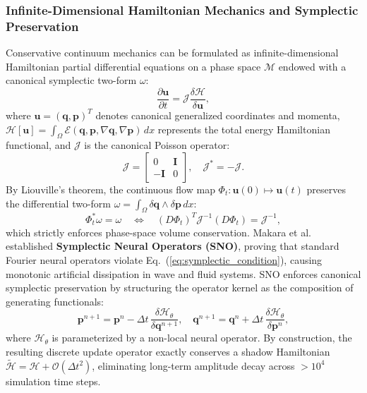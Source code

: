 \subsubsection{Infinite-Dimensional Hamiltonian Mechanics and Symplectic Preservation}
Conservative continuum mechanics can be formulated as infinite-dimensional Hamiltonian partial differential equations on a phase space $\mathcal{M}$ endowed with a canonical symplectic two-form $\omega$:
\begin{equation}
    \frac{\partial \mathbf{u}}{\partial t} = \mathcal{J} \frac{\delta \mathcal{H}}{\delta \mathbf{u}},
    \label{eq:hamiltonian_pde}
\end{equation}
where $\mathbf{u} = (\mathbf{q}, \mathbf{p})^T$ denotes canonical generalized coordinates and momenta, $\mathcal{H}[\mathbf{u}] = \int_\Omega \mathcal{E}(\mathbf{q}, \mathbf{p}, \nabla \mathbf{q}, \nabla \mathbf{p}) \, dx$ represents the total energy Hamiltonian functional, and $\mathcal{J}$ is the canonical Poisson operator:
\begin{equation}
    \mathcal{J} = \begin{bmatrix} 0 & \mathbf{I} \\ -\mathbf{I} & 0 \end{bmatrix}, \quad \mathcal{J}^* = -\mathcal{J}.
\end{equation}
By Liouville's theorem, the continuous flow map $\Phi_t: \mathbf{u}(0) \mapsto \mathbf{u}(t)$ preserves the differential two-form $\omega = \int_\Omega \delta \mathbf{q} \wedge \delta \mathbf{p} \, dx$:
\begin{equation}
    \Phi_t^* \omega = \omega \quad \Longleftrightarrow \quad (D\Phi_t)^T \mathcal{J}^{-1} (D\Phi_t) = \mathcal{J}^{-1},
    \label{eq:symplectic_condition}
\end{equation}
which strictly enforces phase-space volume conservation. Makara et al.~\cite{makara2026symplectic} established \textbf{Symplectic Neural Operators (SNO)}, proving that standard Fourier neural operators violate Eq.~(\ref{eq:symplectic_condition}), causing monotonic artificial dissipation in wave and fluid systems. SNO enforces canonical symplectic preservation by structuring the operator kernel as the composition of generating functionals:
\begin{equation}
    \mathbf{p}^{n+1} = \mathbf{p}^n - \Delta t \, \frac{\delta \mathcal{H}_\theta}{\delta \mathbf{q}^{n+1}}, \quad \mathbf{q}^{n+1} = \mathbf{q}^n + \Delta t \, \frac{\delta \mathcal{H}_\theta}{\delta \mathbf{p}^n},
    \label{eq:sno_update}
\end{equation}
where $\mathcal{H}_\theta$ is parameterized by a non-local neural operator. By construction, the resulting discrete update operator exactly conserves a shadow Hamiltonian $\widetilde{\mathcal{H}} = \mathcal{H} + \mathcal{O}(\Delta t^2)$, eliminating long-term amplitude decay across $>10^4$ simulation time steps.

